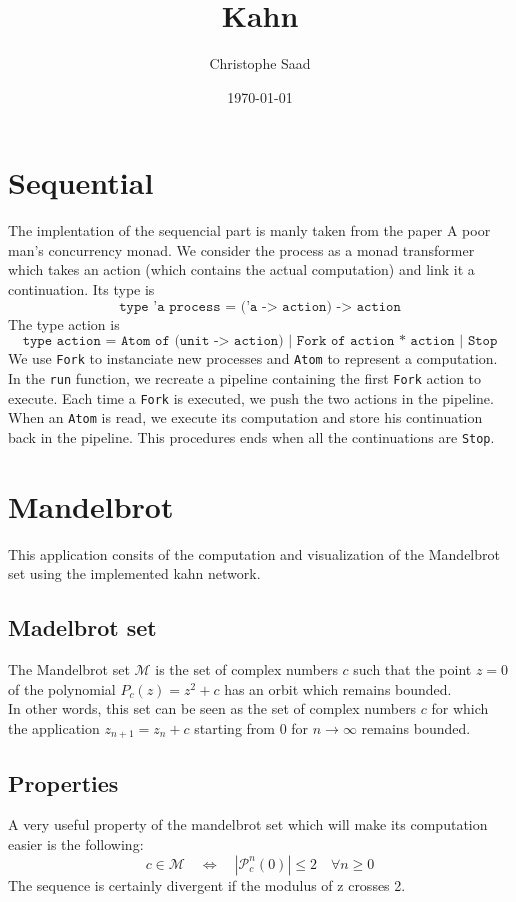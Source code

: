 \documentclass{article}
\title{Kahn}
\author{Christophe Saad}
\date{\today}
\begin{document}
\maketitle

\section{Sequential}
The implentation of the sequencial part is manly taken from the paper  A poor man’s concurrency monad. We consider the process as a monad transformer which takes an action (which contains the actual computation) and link it a continuation. Its type is $$\texttt{type 'a process = ('a -> action) -> action}$$
The type action is $$\texttt{type action  = Atom of (unit -> action) | Fork of action * action | Stop}$$
We use \texttt{Fork} to instanciate new processes and \texttt{Atom} to represent a computation.\\
In the \texttt{run} function, we recreate a pipeline containing the first \texttt{Fork} action to execute. Each time a \texttt{Fork} is executed, we push the two actions in the pipeline. When an \texttt{Atom} is read, we execute its computation and store his continuation back in the pipeline. This procedures ends when all the continuations are \texttt{Stop}.

\section{Mandelbrot}
This application consits of the computation and visualization of the Mandelbrot set using the implemented kahn network.
\subsection{Madelbrot set}
The Mandelbrot set $\mathcal{M}$ is the set of complex numbers $c$ such that the point $z = 0$ of the polynomial $P_c(z) = z^2 + c$ has an orbit which remains bounded. \\
In other words, this set can be seen as the set of complex numbers $c$ for which the application $z_{n+1} = z_n + c$ starting from $0$ for $n \rightarrow \infty$ remains bounded.

\subsection{Properties}
A very useful property of the mandelbrot set which will make its computation easier is the following:
	$$c \in \mathcal{M}  \quad \Longleftrightarrow \quad |\mathcal{P}^n_c(0)| \leq 2 \quad \forall n\geq 0$$
The sequence is certainly divergent if the modulus of z crosses 2.
\end{document}
